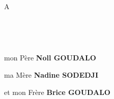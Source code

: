 \dedicace

\paragraph{}
	\begin{center}
		A    
	\end{center}
	\subparagraph*{\\ \\}
	\begin{center}
	 mon Père  \textbf{Noll GOUDALO} 
	\end{center}
	\begin{center}
    ma Mère  \textbf{Nadine SODEDJI}  
	\end{center}
	\begin{center}
      et mon Frère \textbf{Brice GOUDALO}
	\end{center}


 